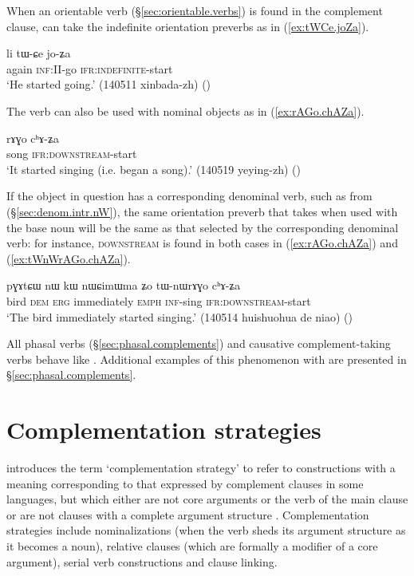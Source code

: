 When an orientable verb (§\ref{sec:orientable.verbs}) is found in the complement clause,  can take the indefinite orientation preverbs as in (\ref{ex:tWCe.joZa}).

\begin{exe} 
\ex \label{ex:tWCe.joZa}
\gll li tɯ-ɕe jo-ʑa \\
again \textsc{inf}:II-go \textsc{ifr}:\textsc{indefinite}-start \\
\glt `He started going.' (140511 xinbada-zh)
()
\end{exe} 

The verb  can also be used with nominal objects as in (\ref{ex:rAGo.chAZa}). 

\begin{exe}
\ex \label{ex:rAGo.chAZa}
\gll rɤɣo cʰɤ-ʑa \\
song \textsc{ifr}:\textsc{downstream}-start \\
\glt `It started singing (i.e. began a song).' (140519 yeying-zh)
()
\end{exe}

If the object in question has a corresponding denominal verb, such as  from  (§\ref{sec:denom.intr.nW}), the same orientation preverb that  takes when used with the base noun will be the same as that selected by the corresponding denominal verb: for instance, \textsc{downstream} is found in both cases in (\ref{ex:rAGo.chAZa}) and (\ref{ex:tWnWrAGo.chAZa}).


\begin{exe}
\ex \label{ex:tWnWrAGo.chAZa}
\gll pɣɤtɕɯ nɯ kɯ nɯɕimɯma ʑo tɯ-nɯrɤɣo cʰɤ-ʑa  \\
bird \textsc{dem} \textsc{erg} immediately \textsc{emph} \textsc{inf}-sing \textsc{ifr}:\textsc{downstream}-start \\
\glt `The bird immediately started singing.' (140514 huishuohua de niao)
()
\end{exe}

All phasal verbs (§\ref{sec:phasal.complements}) and causative complement-taking verbs behave like . Additional examples of this phenomenon with  are presented in §\ref{sec:phasal.complements}.


\section{Complementation strategies}  \label{sec:strategies}
\citet{dixon06complementation} introduces the term `complementation strategy' to refer to constructions with a meaning corresponding to that expressed by complement clauses in some languages, but which either are not core arguments or the verb of the main clause or are not clauses with a complete argument structure \citep[34--40]{dixon06complementation}. Complementation strategies include nominalizations (when the verb sheds its argument structure as it becomes a noun), relative clauses (which are formally a modifier of a core argument), serial verb constructions and clause linking.

